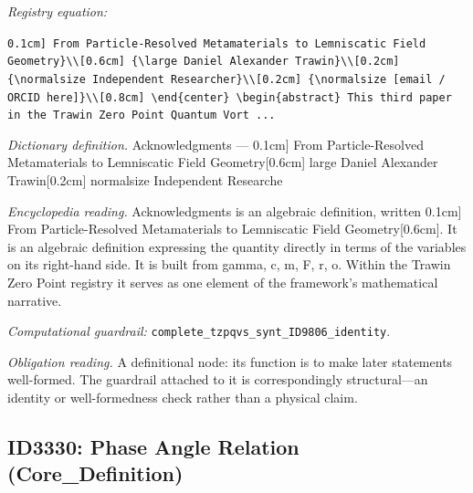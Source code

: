 \documentclass[11pt]{article}
\theoremstyle{remark}
\begin{document}
\noindent\textit{Registry equation:}\par
{\small\texttt{0.1cm] From Particle-Resolved Metamaterials to Lemniscatic Field Geometry\}\textbackslash{}\textbackslash{}[0.6cm] \{\textbackslash{}large Daniel Alexander Trawin\}\textbackslash{}\textbackslash{}[0.2cm] \{\textbackslash{}normalsize Independent Researcher\}\textbackslash{}\textbackslash{}[0.2cm] \{\textbackslash{}normalsize [email / ORCID here]\}\textbackslash{}\textbackslash{}[0.8cm] \textbackslash{}end\{center\} \textbackslash{}begin\{abstract\} This third paper in the Trawin Zero Point Quantum Vort ...}}\par\medskip
\noindent\textit{Dictionary definition.} Acknowledgments --- 0.1cm] From Particle-Resolved Metamaterials to Lemniscatic Field Geometry[0.6cm] large Daniel Alexander Trawin[0.2cm] normalsize Independent Researche\par\medskip
\noindent\textit{Encyclopedia reading.} Acknowledgments is an algebraic definition, written 0.1cm] From Particle-Resolved Metamaterials to Lemniscatic Field Geometry[0.6cm]. It is an algebraic definition expressing the quantity directly in terms of the variables on its right-hand side. It is built from gamma, c, m, F, r, o. Within the Trawin Zero Point registry it serves as one element of the framework's mathematical narrative.
\par\medskip\noindent\textit{Computational guardrail:} \texttt{complete\_tzpqvs\_synt\_ID9806\_identity}.
\par\medskip\noindent\textit{Obligation reading.} A definitional node: its function is to make later statements well-formed. The guardrail attached to it is correspondingly structural---an identity or well-formedness check rather than a physical claim.

\subsection{ID3330: Phase Angle Relation (Core\_Definition)}
\end{document}
